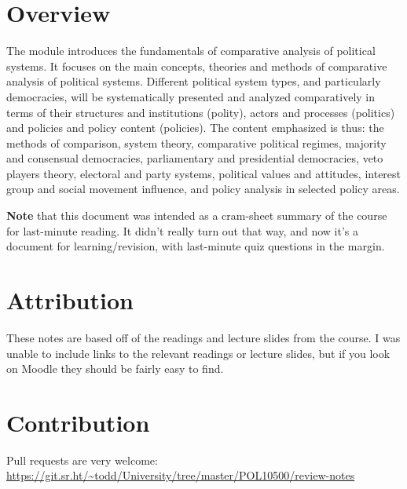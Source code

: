 \section*{Overview}

The module introduces the fundamentals of comparative analysis of
political systems. It focuses on the main concepts, theories and
methods of comparative analysis of political systems. Different
political system types, and particularly democracies, will be
systematically presented and analyzed comparatively in terms of their
structures and institutions (polity), actors and processes (politics)
and policies and policy content (policies). The content emphasized is
thus: the methods of comparison, system theory, comparative political
regimes, majority and consensual democracies, parliamentary and
presidential democracies, veto players theory, electoral and party
systems, political values and attitudes, interest group and social
movement influence, and policy analysis in selected policy areas.

\textbf{Note} that this document was intended as a cram-sheet summary
of the course for last-minute reading. It didn't really turn out that
way, and now it's a document for learning/revision, with last-minute
quiz questions in the margin.

\section*{Attribution}

These notes are based off of the readings and lecture slides from the
course. I was unable to include links to the relevant readings or
lecture slides, but if you look on Moodle they should be fairly easy
to find.

\section*{Contribution}

Pull requests are very welcome:
\url{https://git.sr.ht/~todd/University/tree/master/POL10500/review-notes}
